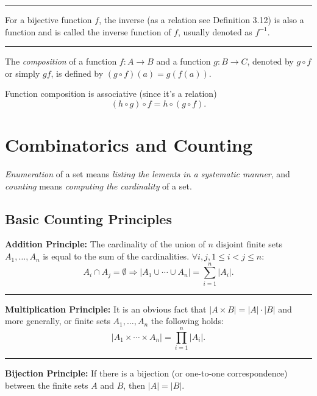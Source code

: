 \documentclass[a4paper]{extarticle}
\newcommand{\Ex}{\textbf{Example:}\ }
\newcommand{\cP}{\mathcal{P}}
\newcommand{\sep}{\vspace{5pt}\noindent\hrule\vspace{5pt}}
\begin{document}
\begin{multicols*}{2}
\sep

 For a bijective function $f$, the inverse (as a relation
see Definition 3.12) is also a function and is called the inverse function of $f$,
usually denoted as $f^{-1}$.

\sep

\Def[Composition] The \emph{composition} of a function $f\colon A \to B$ and a
function $g\colon B \to C$, denoted by $g\circ f$ or simply $gf$, is defined by
$(g \circ f)(a)=g(f(a))$.

\Lem Function composition is associative (since it's a relation)
\[
(h\circ g)\circ f = h\circ (g \circ f).
\]


\section{Combinatorics and Counting}

\emph{Enumeration} of a set means \emph{listing the lements in a systematic
manner}, and \emph{counting} means \emph{computing the cardinality} of a set.

\subsection{Basic Counting Principles}

\textbf{Addition Principle:} The cardinality of the union of $n$ disjoint finite
sets $A_1, \ldots, A_n$ is equal to the sum of the cardinalities. $\forall
i,j,1\leq i < j \leq n$:
\[
A_i \cap A_j = \emptyset \Longrightarrow |A_1\cup \cdots \cup
A_n|=\sum_{i=1}^{n}|A_i|.
\]

\sep

\textbf{Multiplication Principle:} It is an obvious fact that $|A\times B| =
|A|\cdot |B|$ and more generally, or finite sets $A_1,\ldots,A_n$ the following
holds:
\[
|A_1 \times \cdots \times A_n| = \prod_{i=1}^{n} |A_i|.
\]

\sep

\textbf{Bijection Principle:} If there is a bijection (or one-to-one
correspondence) between the finite sets $A$ and $B$, then $|A|=|B|$.

\end{multicols*}
\end{document}
